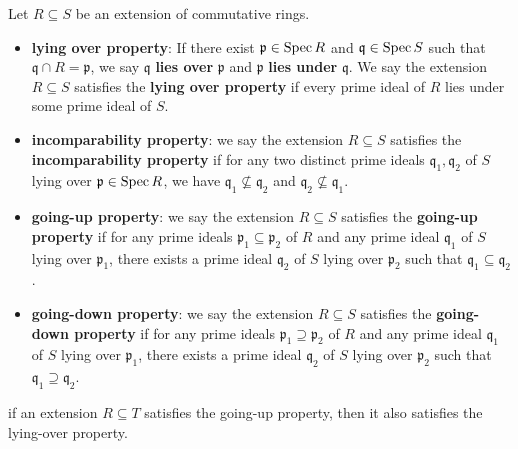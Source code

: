 \begin{definition}{}
    Let $R\subseteq S$ be an extension of commutative rings.
    \begin{itemize}
        \item \textbf{lying over property}: If there exist $\mathfrak{p}\in \operatorname{Spec} R$ and $\mathfrak{q}\in \operatorname{Spec} S$ such that $\mathfrak{q}\cap R=\mathfrak{p}$, we say $\mathfrak{q}$ \textbf{lies over} $\mathfrak{p}$ and $\mathfrak{p}$ \textbf{lies under} $\mathfrak{q}$. We say the extension $R\subseteq S$ satisfies the \textbf{lying over property} if every prime ideal of $R$ lies under some prime ideal of $S$.
        \item \textbf{incomparability property}: we say the extension $R\subseteq S$ satisfies the \textbf{incomparability property} if for any two distinct prime ideals $\mathfrak{q}_1, \mathfrak{q}_2$ of $S$ lying over  $\mathfrak{p}\in \operatorname{Spec} R$, we have $\mathfrak{q}_1\not\subseteq \mathfrak{q}_2$ and $\mathfrak{q}_2\not\subseteq \mathfrak{q}_1$.
        \item \textbf{going-up property}: we say the extension $R\subseteq S$ satisfies the \textbf{going-up property} if for any prime ideals $\mathfrak{p}_1\subseteq \mathfrak{p}_2$ of $R$ and any prime ideal $\mathfrak{q}_1$ of $S$ lying over $\mathfrak{p}_1$, there exists a prime ideal $\mathfrak{q}_2$ of $S$ lying over $\mathfrak{p}_2$ such that $\mathfrak{q}_1\subseteq \mathfrak{q}_2$.
        \item \textbf{going-down property}: we say the extension $R\subseteq S$ satisfies the \textbf{going-down property} if for any prime ideals $\mathfrak{p}_1\supseteq \mathfrak{p}_2$ of $R$ and any prime ideal $\mathfrak{q}_1$ of $S$ lying over $\mathfrak{p}_1$, there exists a prime ideal $\mathfrak{q}_2$ of $S$ lying over $\mathfrak{p}_2$ such that $\mathfrak{q}_1\supseteq \mathfrak{q}_2$.
    \end{itemize}
\end{definition}

\begin{proposition}{}{}
    if an extension $R \subseteq  T$ satisfies the going-up property, then it also satisfies the lying-over property.
\end{proposition}

